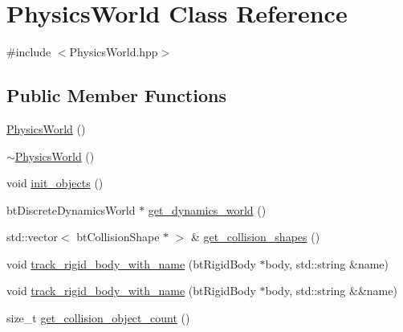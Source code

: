 \hypertarget{classPhysicsWorld}{}\section{Physics\+World Class Reference}
\label{classPhysicsWorld}


{\ttfamily \#include $<$Physics\+World.\+hpp$>$}

\subsection*{Public Member Functions}
\begin{DoxyCompactItemize}
\item 
\hyperlink{classPhysicsWorld_ae7aea476bf3c5d337a4fa5c1ff02f5d4}{Physics\+World} ()
\item 
\hyperlink{classPhysicsWorld_abf1573b008b52b60a83a8f36cbdd51bc}{$\sim$\+Physics\+World} ()
\item 
void \hyperlink{classPhysicsWorld_afdd16b3550a4d701947286021cdef7e6}{init\+\_\+objects} ()
\item 
bt\+Discrete\+Dynamics\+World $\ast$ \hyperlink{classPhysicsWorld_a8f4de36967cf8cfb352e17a75505b2e8}{get\+\_\+dynamics\+\_\+world} ()
\item 
std\+::vector$<$ bt\+Collision\+Shape $\ast$ $>$ \& \hyperlink{classPhysicsWorld_a2e0dfc2aada09e96a9c1215407059fba}{get\+\_\+collision\+\_\+shapes} ()
\item 
void \hyperlink{classPhysicsWorld_a7a1f2ead7a2e7657e7f07b9e2bdddbaa}{track\+\_\+rigid\+\_\+body\+\_\+with\+\_\+name} (bt\+Rigid\+Body $\ast$body, std\+::string \&name)
\item 
void \hyperlink{classPhysicsWorld_afb2afdb6b8cf7e2689581848d6e85ca1}{track\+\_\+rigid\+\_\+body\+\_\+with\+\_\+name} (bt\+Rigid\+Body $\ast$body, std\+::string \&\&name)
\item 
size\+\_\+t \hyperlink{classPhysicsWorld_a1d2dda45c76eabd8a48907309bea6598}{get\+\_\+collision\+\_\+object\+\_\+count} ()
\end{DoxyCompactItemize}
